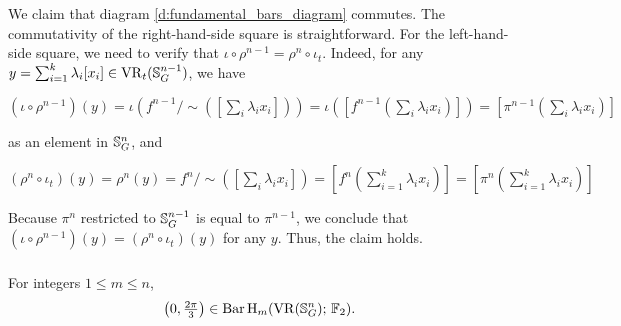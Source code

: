 We claim that diagram \eqref{d:fundamental_bars_diagram} commutes. 
The commutativity of the right-hand-side square is straightforward.
For the left-hand-side square, we need to verify that $\iota \circ \rho^{n-1}=\rho^{n} \circ \iota_t$.
Indeed, for any $y = \sum_{i=1}^k \lambda_i [x_i] \in \operatorname{VR}_t(\mathbb{S}^{n-1}_G)$, we have
\begin{center}
    $(\iota \circ \rho^{n-1})(y)
    =\iota(f^{n-1}/\sim([\sum_i \lambda_i x_i]))
    =\iota([f^{n-1}(\sum_i \lambda_i x_i)])
    =[\pi^{n-1}(\sum_i \lambda_i x_i)]
    $
\end{center}
as an element in $\mathbb{S}^n_G$, and
\begin{center}
    $(\rho^{n} \circ \iota_t)(y) = \rho^{n}(y) = f^{n}/\sim([\sum_i \lambda_i x_i]) = [f^{n}(\sum_{i=1}^k \lambda_i x_i)] = [\pi^{n}(\sum_{i=1}^k \lambda_i x_i)]
    $
\end{center}
Because $\pi^{n}$ restricted to $\mathbb{S}^{n-1}_G$ is equal to $\pi^{n-1}$, we conclude that $(\iota \circ \rho^{n-1})(y) = (\rho^n \circ \iota_t)(y)$ for any $y$.
Thus, the claim holds.

\subsubsection{}

\lemma For integers $1 \leq m \leq n$,
\[
\left(0, \tfrac{2\pi}{3}\right) \in \operatorname{Bar} \operatorname{H}_{m}(\operatorname{VR}(\mathbb{S}^n_G);\,{\mathbb{F}_2}).
\]



